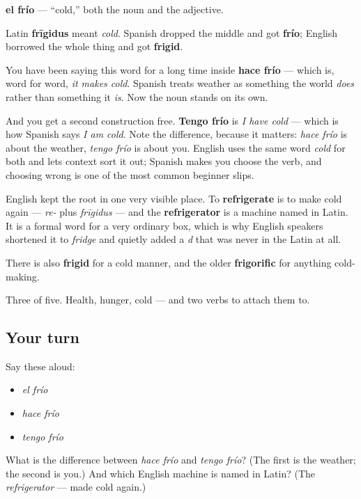 \begin{cousinweb}
\textbf{el frío} — \textquotedblleft{}cold,\textquotedblright{} both the noun and the adjective.

Latin \textbf{frīgidus} meant \emph{cold}. Spanish dropped the middle and got \textbf{frío}; English borrowed the whole thing and got \textbf{frigid}.

You have been saying this word for a long time inside \textbf{hace frío} — which is, word for word, \emph{it makes cold}. Spanish treats weather as something the world \emph{does} rather than something it \emph{is}. Now the noun stands on its own.

And you get a second construction free. \textbf{Tengo frío} is \emph{I have cold} — which is how Spanish says \emph{I am cold}. Note the difference, because it matters: \emph{hace frío} is about the weather, \emph{tengo frío} is about you. English uses the same word \emph{cold} for both and lets context sort it out; Spanish makes you choose the verb, and choosing wrong is one of the most common beginner slips.

English kept the root in one very visible place. To \textbf{refrigerate} is to make cold again — \emph{re-} plus \emph{frīgidus} — and the \textbf{refrigerator} is a machine named in Latin. It is a formal word for a very ordinary box, which is why English speakers shortened it to \emph{fridge} and quietly added a \emph{d} that was never in the Latin at all.

There is also \textbf{frigid} for a cold manner, and the older \textbf{frigorific} for anything cold-making.
\end{cousinweb}

\begin{grammarlens}[title={What you've built}]
Three of five. Health, hunger, cold — and two verbs to attach them to.
\end{grammarlens}

\subsection*{Your turn}
Say these aloud:

\begin{itemize}
\raggedright
  \item \emph{el frío}
  \item \emph{hace frío}
  \item \emph{tengo frío}
\end{itemize}

\begin{tcolorbox}[breakable,colback=teal!4,colframe=teal!35!black,title={Before you move on}]
What is the difference between \emph{hace frío} and \emph{tengo frío}? (The first is the weather; the second is you.) And which English machine is named in Latin? (The \emph{refrigerator} — made cold again.)
\end{tcolorbox}
